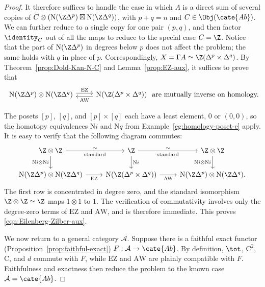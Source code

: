 \begin{proof}
	It therefore suffices to handle the case in which $A$ is a direct sum of
	several copies of
	$C\otimes(\mathrm{N}(\Z\Delta^p)\boxtimes
	\mathrm{N}(\Z\Delta^q))$, with $p+q=n$ and
	$C\in\Obj(\cate{Ab})$. We can further reduce to a single copy for one
	pair $(p,q)$, and then factor $\identity_C$ out of all the maps to reduce
	to the special case $C=\Z$. Notice that the part of
	$\mathrm{N}(\Z\Delta^p)$ in degrees below $p$ does not affect the
	problem; the same holds with $q$ in place of $p$. Correspondingly,
	$X=\Gamma A\simeq\Z(\Delta^p\times\Delta^q)$. By
	Theorem~\ref{prop:Dold-Kan-N-C} and Lemma~\ref{prop:EZ-aux}, it suffices
	to prove that
	\begin{equation}\label{eqn:Eilenberg-Zilber-aux}
		\begin{tikzcd}
			\mathrm{N}(\Z\Delta^p) \otimes \mathrm{N}(\Z\Delta^q) \arrow[shift left, r, "\mathrm{EZ}"] & \mathrm{N}(\Z(\Delta^p \times \Delta^q)) \arrow[shift left, l, "\mathrm{AW}"]
		\end{tikzcd}
		\; \text{are mutually inverse on homology.}
	\end{equation}

	The posets $[p]$, $[q]$, and $[p]\times[q]$ each have a least element,
	$0$ or $(0,0)$, so the homotopy equivalences $\mathrm{N}i$ and
	$\mathrm{N}q$ from Example~\ref{eg:homology-poset-e} apply. It is easy
	to verify that the following diagram commutes:
	\begin{equation*}\begin{tikzcd}
		\Z \otimes \Z \arrow[d, "{\mathrm{N}i \otimes \mathrm{N}i}"'] \arrow[r, "\sim", "\text{standard}"'] & \Z \arrow[d, "{\mathrm{N}i}"] \arrow[r, "\sim", "\text{standard}"'] & \Z \otimes \Z \arrow[d, "{\mathrm{N}i \otimes \mathrm{N}i}"'] \\
		\mathrm{N}(\Z\Delta^p) \otimes \mathrm{N}(\Z\Delta^q) \arrow[r, "\mathrm{EZ}"'] & \mathrm{N}(\Z(\Delta^p \times \Delta^q)) \arrow[r, "\mathrm{AW}"'] & \mathrm{N}(\Z\Delta^p) \otimes \mathrm{N}(\Z\Delta^q).
	\end{tikzcd}\end{equation*}
	The first row is concentrated in degree zero, and the standard isomorphism
	$\Z\otimes\Z\simeq\Z$ maps $1\otimes1$ to $1$. The verification of
	commutativity involves only the degree-zero terms of $\mathrm{EZ}$ and
	$\mathrm{AW}$, and is therefore immediate. This proves
	\eqref{eqn:Eilenberg-Zilber-aux}.

	We now return to a general category $\mathcal{A}$. Suppose there is a
	faithful exact functor (Proposition~\ref{prop:faithful-exact})
	$F:\mathcal{A}\to\cate{Ab}$. By definition, $\tot$, $\mathrm{C}^2$,
	$\mathrm{C}$, and $d$ commute with $F$, while
	$\overline{\mathrm{EZ}}$ and $\overline{\mathrm{AW}}$ are plainly
	compatible with $F$. Faithfulness and exactness then reduce the problem to
	the known case $\mathcal{A}=\cate{Ab}$.


\end{proof}
